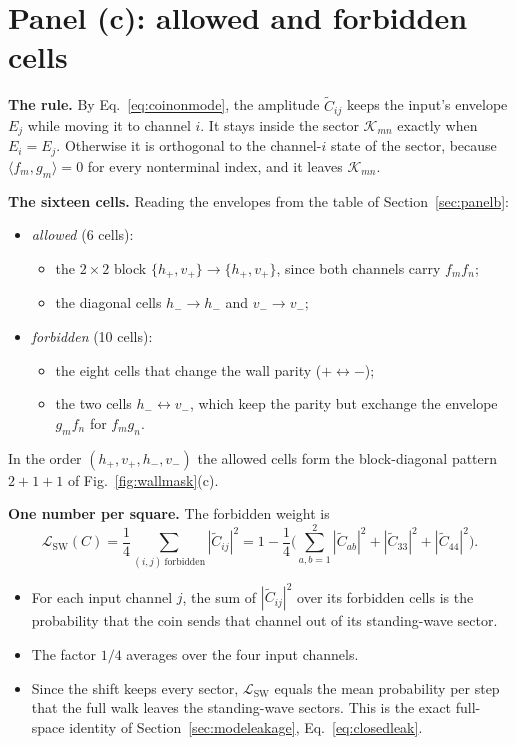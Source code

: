 \documentclass[11pt,a4paper,oneside]{report}
\newcommand{\sw}{\mathrm{SW}}
\numberwithin{equation}{chapter}
\begin{document}
\section{Panel (c): allowed and forbidden cells}
\label{sec:envelope}

\textbf{The rule.} By Eq.~\eqref{eq:coinonmode}, the amplitude
\(\widetilde C_{ij}\) keeps the input's envelope \(E_j\) while moving it
to channel \(i\). It stays inside the sector \(\mathcal K_{mn}\) exactly
when \(E_i=E_j\). Otherwise it is orthogonal to the channel-\(i\) state of
the sector, because \(\langle f_m,g_m\rangle=0\) for every nonterminal
index, and it leaves \(\mathcal K_{mn}\).

\textbf{The sixteen cells.} Reading the envelopes from the table of
Section~\ref{sec:panelb}:
\begin{itemize}
\item \emph{allowed} (6 cells):
\begin{itemize}
\item the \(2\times2\) block \(\{h_+,v_+\}\to\{h_+,v_+\}\), since both
channels carry \(f_mf_n\);
\item the diagonal cells \(h_-\to h_-\) and \(v_-\to v_-\);
\end{itemize}
\item \emph{forbidden} (10 cells):
\begin{itemize}
\item the eight cells that change the wall parity
(\(+\leftrightarrow-\));
\item the two cells \(h_-\leftrightarrow v_-\), which keep the parity but
exchange the envelope \(g_mf_n\) for \(f_mg_n\).
\end{itemize}
\end{itemize}
In the order \((h_+,v_+,h_-,v_-)\) the allowed cells form the
block-diagonal pattern \(2+1+1\) of Fig.~\ref{fig:wallmask}(c).

\textbf{One number per square.} The forbidden weight is
\begin{equation}
\boxed{\mathcal L_{\sw}(C)=\frac14\sum_{(i,j)\ \mathrm{forbidden}}
|\widetilde C_{ij}|^2
=1-\frac14\Big(\sum_{a,b=1}^2|\widetilde C_{ab}|^2
+|\widetilde C_{33}|^2+|\widetilde C_{44}|^2\Big).}
\label{eq:Lswcells}
\end{equation}
\begin{itemize}
\item For each input channel \(j\), the sum of \(|\widetilde C_{ij}|^2\)
over its forbidden cells is the probability that the coin sends that
channel out of its standing-wave sector.
\item The factor \(1/4\) averages over the four input channels.
\item Since the shift keeps every sector, \(\mathcal L_{\sw}\) equals the
mean probability per step that the full walk leaves the standing-wave
sectors. This is the exact full-space identity of
Section~\ref{sec:modeleakage}, Eq.~\eqref{eq:closedleak}.
\end{itemize}
\end{document}
